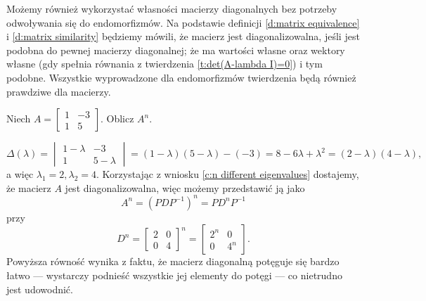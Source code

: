 Możemy również wykorzystać własności macierzy diagonalnych bez potrzeby odwoływania się do endomorfizmów. Na podstawie definicji \ref{d:matrix equivalence} i \ref{d:matrix similarity} będziemy mówili, że macierz jest diagonalizowalna, jeśli jest podobna do pewnej macierzy diagonalnej; że ma wartości własne oraz wektory własne (gdy spełnia równania z twierdzenia \ref{t:det(A-lambda I)=0}) i tym podobne. Wszystkie wyprowadzone dla endomorfizmów twierdzenia będą również prawdziwe dla macierzy.

\begin{example}
    Niech $A = \begin{bmatrix}
        1 & -3 \\
        1 & 5
    \end{bmatrix}$. Oblicz $A^n$.
\end{example}
\begin{solution}
    \[ \Delta(\lambda) = \begin{vmatrix}
        1 - \lambda & -3 \\
        1 & 5 - \lambda
    \end{vmatrix} = (1-\lambda)(5-\lambda) - (-3) = 8 - 6\lambda + \lambda^2 = (2 - \lambda)(4 - \lambda), \]
    a więc $\lambda_1 = 2, \lambda_2 = 4$. Korzystając z wniosku \ref{c:n different eigenvalues} dostajemy, że macierz $A$ jest diagonalizowalna, więc możemy przedstawić ją jako
    \[ A^n = (PDP^{-1})^n = PD^nP^{-1} \]
    przy
    \[ D^n = \begin{bmatrix}
        2 & 0 \\
        0 & 4
    \end{bmatrix}^n = \begin{bmatrix}
        2^n & 0 \\
        0 & 4^n
    \end{bmatrix}. \]
    Powyższa równość wynika z faktu, że macierz diagonalną potęguje się bardzo łatwo --- wystarczy podnieść wszystkie jej elementy do potęgi --- co nietrudno jest udowodnić.


\end{solution}
